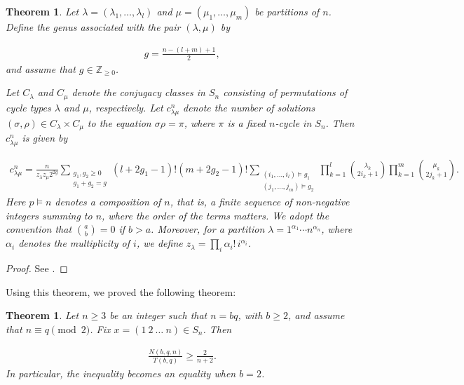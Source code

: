 \documentclass[12pt,reqno]{amsart}
\newcommand{\Zz}{\mathbb{Z}_{\geq 0}}						%
\newcommand{\A}{\alpha}									%
\newcommand{\la}{\lambda}								%
\newcommand{\f}[2]{\frac{#1}{#2}}							%
\theoremstyle{mythmstyle}
\newtheorem{thm}[lemma]{Theorem}
\theoremstyle{mydefstyle}
\newcommand{\sigman}{(1\ 2\ \ldots\ n)}
\numberwithin{equation}{section}
\begin{document}
\begin{thm}
\label{thm:goupil}
Let $\lambda = (\lambda_{1}, \dotsc, \lambda_{l})$ and $\mu = (\mu_{1}, \dotsc, \mu_{m})$
be partitions of $n$.
Define the genus associated with the pair $(\lambda, \mu)$ by

\begin{align}
g = \frac{n-(l+m)+1}{2},
\end{align}
and assume that $g \in \Zz$.

Let $C_\lambda$ and $C_\mu$ denote the conjugacy classes in $S_n$
consisting of permutations of cycle types $\lambda$ and $\mu$,
respectively. 
Let $c_{\lambda \mu}^{n}$ denote the number of solutions $(\sigma, \rho) \in C_{\lambda} \times C_{\mu}$
to the equation $\sigma \rho = \pi$,
where $\pi$ is a fixed $n$-cycle in $S_{n}$.
Then $c_{\lambda \mu}^{n}$ is given by

\begin{align}
c_{\la \mu}^{n} = \f{n}{z_{\la}z_{\mu}2^{2g}}\sum_{\substack{g_{1},g_{2}\ge 0\\ g_{1}+g_{2}=g}}(l+2g_{1}-1)! (m+2g_{2}-1)!
\sum_{\substack{(i_{1},\dotsc,i_{l})\vDash g_{1}\\(j_{1},\dotsc,j_{m})\vDash g_{2}}}
\prod_{k=1}^{l}\binom{\la_{k}}{2i_{k}+1}\prod_{k=1}^{m}\binom{\mu_{k}}{2j_{k}+1}.
\end{align}
Here $p \vDash n$ denotes a composition of $n$, that is, a finite sequence of non-negative integers
summing to $n$, where the order of the terms matters. We adopt the convention that $\binom{a}{b}=0$ if $b>a$.
Moreover, for a partition $\lambda = 1^{\A_{1}}\cdots n^{\A_{n}}$, where $\A_{i}$ denotes the multiplicity of $i$, we define
$z_{\lambda} = \prod_{i} \A_{i}! \, i^{\A_{i}}$.
\end{thm}

\begin{proof}
See \cite[Theorem~2.1]{Goupil98}.
\end{proof}

Using this theorem, we proved the following theorem:

\begin{thm}
\label{thm:MN}
Let $n \ge 3$ be an integer such that $n = bq$, with $b \ge 2$, and assume that $n \equiv q \pmod{2}$.
Fix $x = \sigman \in S_{n}$. Then

\begin{align}
\f{N(b, q, n)}{T(b, q)} \ge \f{2}{n+2}.
\end{align}
In particular, the inequality becomes an equality when $b = 2$.
\end{thm}
\end{document}
